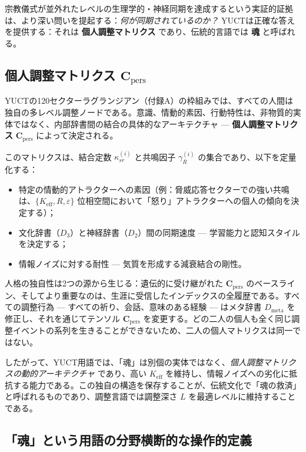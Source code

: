 \documentclass[12pt,a4paper]{article}
\begin{document}
	宗教儀式が並外れたレベルの生理学的・神経同期を達成するという実証的証拠は、より深い問いを提起する：\emph{何が同期されているのか？} YUCTは正確な答えを提供する：それは \textbf{個人調整マトリクス} であり、伝統的言語では \textbf{魂} と呼ばれる。
	
	\subsection{個人調整マトリクス \(\mathbf{C}_{\text{pers}}\)}
	
	YUCTの120セクターラグランジアン（付録A）の枠組みでは、すべての人間は独自の多レベル調整ノードである。意識、情動的素因、行動特性は、非物質的実体ではなく、内部辞書間の結合の具体的なアーキテクチャ — \textbf{個人調整マトリクス} \(\mathbf{C}_{\text{pers}}\) によって決定される。
	
	このマトリクスは、結合定数 \(\kappa_{sr}^{(i)}\) と共鳴因子 \(\gamma_{R}^{(i)}\) の集合であり、以下を定量化する：
	\begin{itemize}
		\item 特定の情動的アトラクターへの素因（例：脅威応答セクターでの強い共鳴は、\(\{K_{\mathrm{eff}}, R, \varepsilon\}\) 位相空間において「怒り」アトラクターへの個人の傾向を決定する）；
		\item 文化辞書（\(D_3\)）と神経辞書（\(D_2\)）間の同期速度 — 学習能力と認知スタイルを決定する；
		\item 情報ノイズに対する耐性 — 気質を形成する減衰結合の剛性。
	\end{itemize}
	
	人格の独自性は2つの源から生じる：遺伝的に受け継がれた \(\mathbf{C}_{\text{pers}}\) のベースライン、そしてより重要なのは、生涯に受信したインデックスの全履歴である。すべての調整行為 — すべての祈り、会話、意味のある経験 — はメタ辞書 \(D_{\text{meta}}\) を修正し、それを通じてテンソル \(\mathbf{C}_{\text{pers}}\) を変更する。どの二人の個人も全く同じ調整イベントの系列を生きることができないため、二人の個人マトリクスは同一ではない。
	
	したがって、YUCT用語では、「魂」は別個の実体ではなく、\emph{個人調整マトリクスの動的アーキテクチャ} であり、高い \(K_{\mathrm{eff}}\) を維持し、情報ノイズへの劣化に抵抗する能力である。この独自の構造を保存することが、伝統文化で「魂の救済」と呼ばれるものであり、調整言語では調整深さ \(L\) を最適レベルに維持することである。
	
	\subsection{「魂」という用語の分野横断的な操作的定義}
	\label{subsec:soul-definition}
	
\end{document}
